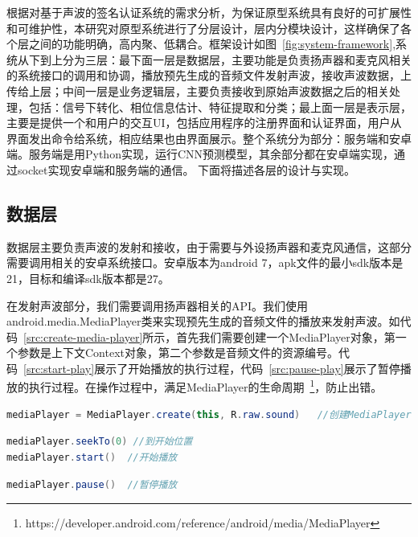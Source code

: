 根据对基于声波的签名认证系统的需求分析，为保证原型系统具有良好的可扩展性和可维护性，本研究对原型系统进行了分层设计，层内分模块设计，这样确保了各个层之间的功能明确，高内聚、低耦合。框架设计如图~\ref{fig:system-framework},系统从下到上分为三层：最下面一层是数据层，主要功能是负责扬声器和麦克风相关的系统接口的调用和协调，播放预先生成的音频文件发射声波，接收声波数据，上传给上层；中间一层是业务逻辑层，主要负责接收到原始声波数据之后的相关处理，包括：信号下转化、相位信息估计、特征提取和分类；最上面一层是表示层，主要是提供一个和用户的交互UI，包括应用程序的注册界面和认证界面，用户从界面发出命令给系统，相应结果也由界面展示。整个系统分为部分：服务端和安卓端。服务端是用Python实现，运行CNN预测模型，其余部分都在安卓端实现，通过socket实现安卓端和服务端的通信。 下面将描述各层的设计与实现。


\subsection{数据层}
数据层主要负责声波的发射和接收，由于需要与外设扬声器和麦克风通信，这部分需要调用相关的安卓系统接口。安卓版本为android 7，apk文件的最小sdk版本是21，目标和编译sdk版本都是27。

在发射声波部分，我们需要调用扬声器相关的API。我们使用android.media.MediaPlayer类来实现预先生成的音频文件的播放来发射声波。如代码~\ref{src:create-media-player}所示，首先我们需要创建一个MediaPlayer对象，第一个参数是上下文Context对象，第二个参数是音频文件的资源编号。代码~\ref{src:start-play}展示了开始播放的执行过程，代码~\ref{src:pause-play}展示了暂停播放的执行过程。在操作过程中，满足MediaPlayer的生命周期~\footnote{https://developer.android.com/reference/android/media/MediaPlayer}，防止出错。
\begin{lstlisting}[language={Java}, caption={创建MediaPlayer对象 \label{src:create-media-player}}]
mediaPlayer = MediaPlayer.create(this, R.raw.sound)   //创建MediaPlayer对象
\end{lstlisting}

\begin{lstlisting}[language={Java}, caption={开始播放 \label{src:start-play}}]
mediaPlayer.seekTo(0) //到开始位置
mediaPlayer.start()  //开始播放
\end{lstlisting}

\begin{lstlisting}[language={Java}, caption={暂停播放\label{src:pause-play}} ]
mediaPlayer.pause()  //暂停播放
\end{lstlisting}

